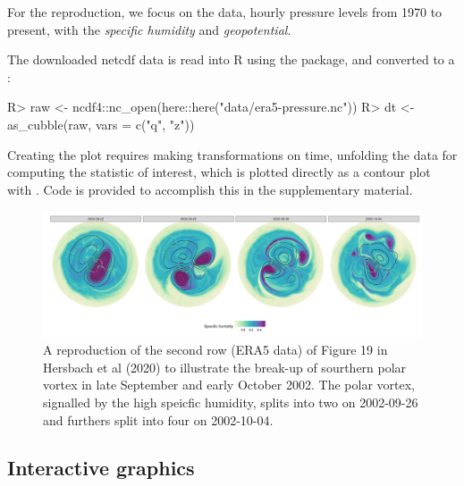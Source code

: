 \documentclass[
]{jss}
\begin{document}
For the reproduction, we focus on the  data, hourly pressure levels from 1970 to present, with the \emph{specific humidity} and \emph{geopotential}.

The downloaded netcdf data is read into R using the  package, and converted to a :

\begin{CodeChunk}
\begin{CodeInput}
R> raw <- ncdf4::nc_open(here::here("data/era5-pressure.nc"))
R> dt <- as_cubble(raw, vars = c("q", "z"))
\end{CodeInput}
\end{CodeChunk}

Creating the plot requires making transformations on time, unfolding the data for computing the statistic of interest, which is plotted directly as a contour plot with . Code is provided to accomplish this in the supplementary material.

\begin{CodeChunk}
\begin{figure}

{\centering \includegraphics[width=1\linewidth]{../figures/netcdf} 

}

\caption[A reproduction of the second row (ERA5 data) of Figure 19 in Hersbach et al (2020) to illustrate the break-up of sourthern polar vortex in late September and early October 2002]{A reproduction of the second row (ERA5 data) of Figure 19 in Hersbach et al (2020) to illustrate the break-up of sourthern polar vortex in late September and early October 2002. The polar vortex, signalled by the high speicfic humidity, splits into two on 2002-09-26 and furthers split into four on 2002-10-04.}\label{fig:netcdf}
\end{figure}
\end{CodeChunk}

\hypertarget{interactive-graphics-1}{%
\subsection{Interactive graphics}\label{interactive-graphics-1}}
\end{document}
